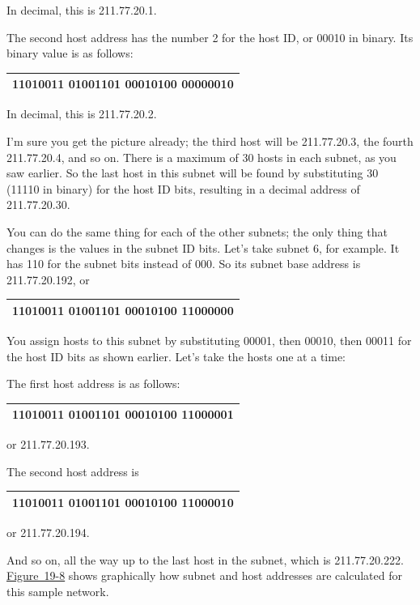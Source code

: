 In decimal, this is 211.77.20.1.

The second host address has the number 2 for the host ID, or 00010 in
binary. Its binary value is as follows:

\begin{longtable}[]{@{}l@{}}
\toprule
\endhead
11010011 01001101 00010100 {\textbf{000}}{00010}\tabularnewline
\bottomrule
\end{longtable}

In decimal, this is 211.77.20.2.

I'm sure you get the picture already; the third host will be
211.77.20.3, the fourth 211.77.20.4, and so on. There is a maximum of 30
hosts in each subnet, as you saw earlier. So the last host in this
subnet will be found by substituting 30 (11110 in binary) for the host
ID bits, resulting in a decimal address of 211.77.20.30.

You can do the same thing for each of the other subnets; the only thing
that changes is the values in the subnet ID bits. Let's take subnet 6,
for example. It has 110 for the subnet bits instead of 000. So its
subnet base address is 211.77.20.192, or

\begin{longtable}[]{@{}l@{}}
\toprule
\endhead
11010011 01001101 00010100 {\textbf{110}}{00000}\tabularnewline
\bottomrule
\end{longtable}

You assign hosts to this subnet by substituting 00001, then 00010, then
00011 for the host ID bits as shown earlier. Let's take the hosts one at
a time:

The first host address is as follows:

\begin{longtable}[]{@{}l@{}}
\toprule
\endhead
11010011 01001101 00010100 {\textbf{110}}{00001}\tabularnewline
\bottomrule
\end{longtable}

or 211.77.20.193.

The second host address is

\begin{longtable}[]{@{}l@{}}
\toprule
\endhead
11010011 01001101 00010100 {\textbf{110}}{00010}\tabularnewline
\bottomrule
\end{longtable}

or 211.77.20.194.

And so on, all the way up to the last host in the subnet, which is
211.77.20.222.
\protect\hyperlink{ch19s05.htmlux5cux23determining_host_addresses_for_a_class_c}{Figure~19-8}
shows graphically how subnet and host addresses are calculated for this
sample network.

